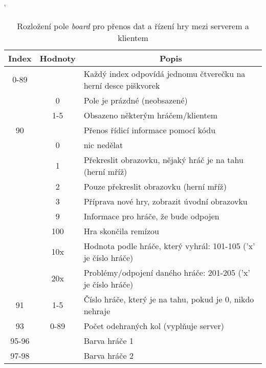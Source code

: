 \begin{table}[hbtp]
\catcode`
\caption{\label{tab:packet_server-client}Rozložení pole \textit{board} pro přenos dat a řízení hry mezi serverem a klientem}
\begin{tabular}{|c|c|l|}
\hline
Index   & Hodnoty     & \multicolumn{1}{c|}{Popis}                                      \\ \hline
0-89    &             & Každý index odpovídá jednomu čtverečku na herní desce piškvorek \\ \cline{2-3}
        & 0           & Pole je prázdné (neobsazené)                                    \\ \cline{2-3}
        & 1-5         & Obsazeno některým hráčem/klientem                               \\ \hline
90      &             & Přenos řídicí informace pomocí kódu                             \\ \cline{2-3}
        & 0           & nic nedělat                                                     \\ \cline{2-3}
        & 1           & Překreslit obrazovku, nějaký hráč je na tahu (herní mříž)       \\ \cline{2-3}
        & 2           & Pouze překreslit obrazovku  (herní mříž)                        \\ \cline{2-3}
        & 3           & Příprava nové hry, zobrazit úvodní obrazovku                    \\ \cline{2-3}
        & 9           & Informace pro hráče, že bude odpojen                            \\ \cline{2-3}
        & 100         & Hra skončila remízou                                            \\ \cline{2-3}
        & 10x         & Hodnota podle hráče, který vyhrál: 101-105 ('x' je číslo hráče) \\ \cline{2-3}
        & 20x         & Problémy/odpojení daného hráče: 201-205 ('x' je číslo hráče)  \\ \hline
91      & 1-5         & Číslo hráče, který je na tahu, pokud je 0, nikdo nehraje        \\ \hline
93      & 0-89        & Počet odehraných kol (vyplňuje server)                          \\ \hline
95-96   &             & Barva hráče 1                                                   \\ \cline{1-1} \cline{3-3}
97-98   &             & Barva hráče 2                                                   \\ \cline{1-1} \cline{3-3}

\end{tabular}
\end{table}
